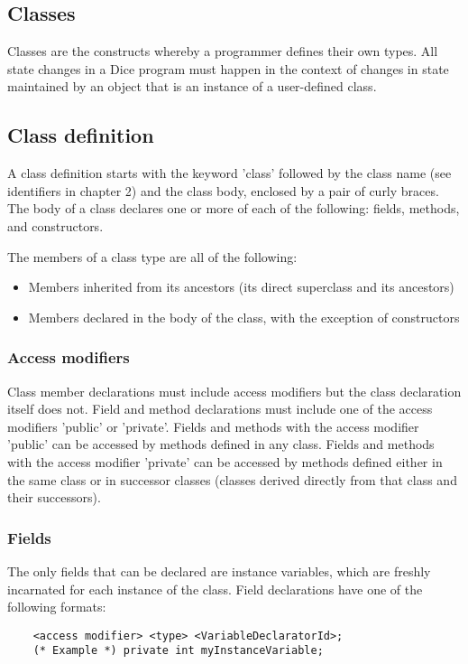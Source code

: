 \begin{homeworkProblem}
	\chapter{Classes}
	
	Classes are the constructs whereby a programmer defines their own types. All state changes in a Dice program must happen in the context of changes in state maintained by an object that is an instance of a user-defined class.
	
	\section{Class definition}
	A class definition starts with the keyword 'class' followed by the class name (see identifiers in chapter 2) and the class body, enclosed by a pair of curly braces. The body of a class declares one or more of each of the following: fields, methods, and constructors.
	
	The members of a class type are all of the following:
	\begin{itemize}
		\item Members inherited from its ancestors (its direct superclass and its ancestors)
		\item Members declared in the body of the class, with the exception of constructors
	\end{itemize}
	
	\subsection{Access modifiers}
	Class member declarations must include access modifiers but the class declaration itself does not. Field and method declarations must include one of the access modifiers 'public' or 'private'. Fields and methods with the access modifier 'public' can be accessed by methods defined in any class. Fields and methods with the access modifier 'private' can be accessed by methods defined either in the same class or in successor classes (classes derived directly from that class and their successors).
	
	\subsection{Fields}
	The only fields that can be declared are instance variables, which are freshly incarnated for each instance of the class.
	Field declarations have one of the following formats:
	\begin{verbatim}
	<access modifier> <type> <VariableDeclaratorId>;
	(* Example *) private int myInstanceVariable;
	

\end{verbatim}
\end{homeworkProblem}
